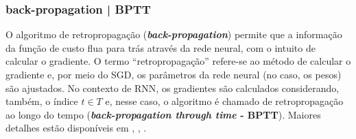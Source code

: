 \documentclass{automatextcc}
\begin{document}
\subsubsection{back-propagation | BPTT}
O algoritmo de retropropagação (\textbf{\textit{back-propagation}}) permite que a informação da função de custo flua para trás através da rede neural, com o intuito de calcular o gradiente. O termo ``retropropagação'' refere-se ao método de calcular o gradiente e, por meio do SGD, os parâmetros da rede neural (no caso, os pesos) são ajustados. No contexto de RNN, os gradientes são calculados considerando, também, o índice $t \in T$ e, nesse caso, o algoritmo é chamado de retropropagação ao longo do tempo (\textbf{\textit{back-propagation through time} - BPTT}). Maiores detalhes estão disponíveis em \citet{haykin2008}, \citet{goodfellow2016}, \citet{fan2021}.  


\end{document}
